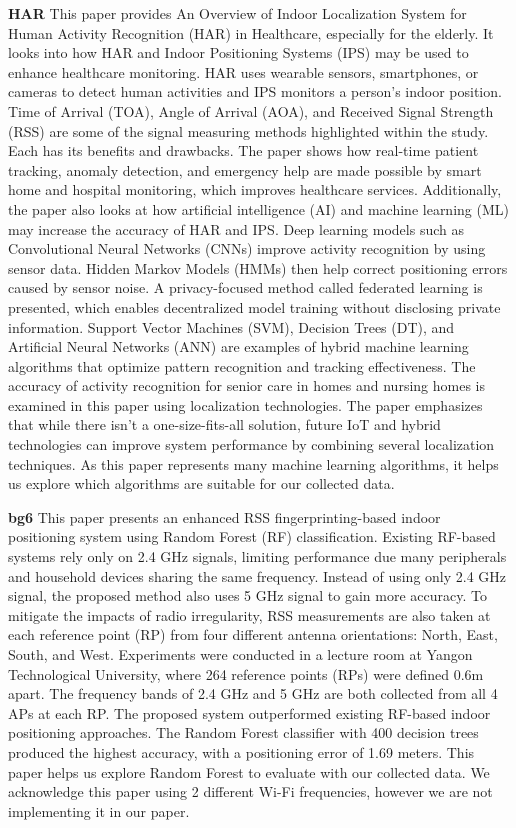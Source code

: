 \documentclass[conference]{IEEEtran}
\begin{document}
	\textbf{HAR}
	This paper provides An Overview of Indoor Localization System for Human Activity Recognition (HAR) in Healthcare, especially for the elderly. It looks into how HAR and Indoor Positioning Systems (IPS) may be used to enhance healthcare monitoring. HAR uses wearable sensors, smartphones, or cameras to detect human activities and IPS monitors a person's indoor position. Time of Arrival (TOA), Angle of Arrival (AOA), and Received Signal Strength (RSS) are some of the signal measuring methods highlighted within the study. Each has its benefits and drawbacks. The paper shows how real-time patient tracking, anomaly detection, and emergency help are made possible by smart home and hospital monitoring, which improves healthcare services. Additionally, the paper also looks at how artificial intelligence (AI) and machine learning (ML) may increase the accuracy of HAR and IPS. Deep learning models such as Convolutional Neural Networks (CNNs) improve activity recognition by using sensor data. Hidden Markov Models (HMMs) then help correct positioning errors caused by sensor noise. A privacy-focused method called federated learning is presented, which enables decentralized model training without disclosing private information. Support Vector Machines (SVM), Decision Trees (DT), and Artificial Neural Networks (ANN) are examples of hybrid machine learning algorithms that optimize pattern recognition and tracking effectiveness. The accuracy of activity recognition for senior care in homes and nursing homes is examined in this paper using localization technologies. The paper emphasizes that while there isn't a one-size-fits-all solution, future IoT and hybrid technologies can improve system performance by combining several localization techniques. As this paper represents many machine learning algorithms, it helps us explore which algorithms are suitable for our collected data.
	
	\textbf{bg6}
	This paper presents an enhanced RSS fingerprinting-based indoor positioning system using Random Forest (RF) classification. Existing RF-based systems rely only on 2.4 GHz signals, limiting performance due many peripherals and household devices sharing the same frequency. Instead of using only 2.4 GHz signal, the proposed method also uses 5 GHz signal to gain more accuracy. To mitigate the impacts of radio irregularity, RSS measurements are also taken at each reference point (RP) from four different antenna orientations: North, East, South, and West. 
	Experiments were conducted in a lecture room at Yangon Technological University, where 264 reference points (RPs) were defined 0.6m apart. The frequency bands of 2.4 GHz and 5 GHz are both collected from all 4 APs at each RP. The proposed system outperformed existing RF-based indoor positioning approaches. The Random Forest classifier with 400 decision trees produced the highest accuracy, with a positioning error of 1.69 meters. This paper helps us explore Random Forest to evaluate with our collected data. We acknowledge this paper using 2 different Wi-Fi frequencies, however we are not implementing it in our paper.
	
\end{document}

